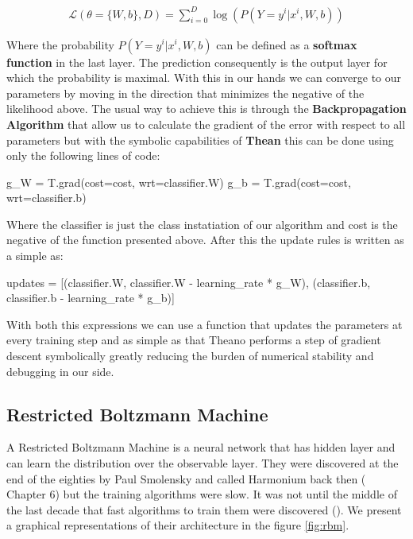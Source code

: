\documentclass[11pt,a4paper]{article}
\begin{document}
\begin{align*}
\mathcal{L}(\theta = \{W, b\}, D) = \sum_{i=0}^{D} 
\log(P(Y = y^i | x^i , W, b	))
\end{align*}

Where the probability $P(Y = y^i | x^i , W, b	)$ can be defined as a \textbf{softmax function} in the last layer. The prediction consequently is the output layer for which the probability is maximal.  With this in our hands we can converge to our parameters by moving in the direction that minimizes the negative of the likelihood above. The usual way to achieve this is through the \textbf{Backpropagation Algorithm} that allow us to calculate the gradient of the error with respect to all parameters but with the symbolic capabilities of \textbf{Thean} this can be done using only the following lines of code:


\begin{python}
g_W = T.grad(cost=cost, wrt=classifier.W)
g_b = T.grad(cost=cost, wrt=classifier.b)
\end{python}

Where the classifier is just the class instatiation of our algorithm and cost is the negative of the function presented above. After this the update rules is written as a simple as:

\begin{center}
\begin{python}
updates = [(classifier.W, classifier.W - learning_rate * g_W),
           (classifier.b, classifier.b - learning_rate * g_b)]
\end{python}
\end{center}

With both this expressions we can use a function that updates the parameters at every training step and as simple as that Theano performs a step of gradient descent symbolically greatly reducing the burden of numerical stability and debugging in our side.

\subsection{Restricted Boltzmann Machine}

A Restricted Boltzmann Machine is a neural network that has hidden layer and can learn the distribution over the observable layer. They were discovered at the end of the eighties by Paul Smolensky and called Harmonium back then (\cite{mcclelland1986parallel} Chapter 6) but the training algorithms were slow. It was not until the middle of the last decade that fast algorithms to train them were discovered (\cite{hinton2006reducing}). We present a graphical representations of their architecture in the figure \ref{fig:rbm}.
\end{document}
